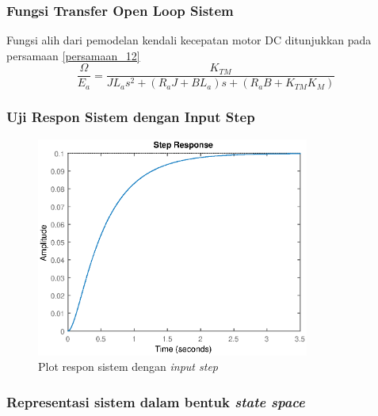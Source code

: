 \documentclass[../main.tex]{subfiles}
\begin{document}
                \subsubsection{Fungsi Transfer Open Loop Sistem}
                    Fungsi alih dari pemodelan kendali kecepatan motor DC ditunjukkan pada persamaan \ref{persamaan_12}
                    \begin{equation}
                        \frac{\Omega}{E_a} = \frac{K_{TM}}{JL_as^2 + (R_aJ + BL_a)s + (R_aB + K_{TM}K_M)}
                        \label{persamaan_12}
                    \end{equation}
                \subsubsection{Uji Respon Sistem dengan Input Step}
                    
                    
                    \begin{figure}[H]
                        \centering
                        \includegraphics[width = 0.8\textwidth]{assets/image/UJI_SISTEM_2_1.eps}
                        \caption{Plot respon sistem dengan \textit{input step}}
                        \label{plot_respon_sistem_motor_1}
                    \end{figure}
                \subsubsection{Representasi sistem dalam bentuk \textit{state space}}
                    
                    
\end{document}
